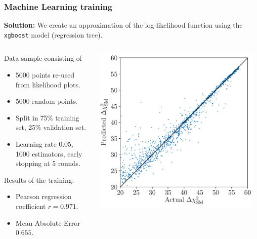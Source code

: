 \documentclass[mathserif, 10pt, dvipsnames]{beamer}
\begin{document}
\begin{frame}\frametitle{Machine Learning training}

    \textbf{Solution:} We create an approximation of the log-likelihood function using the \texttt{xgboost} model (regression tree).

    \begin{columns}
        \begin{column}{0.5\textwidth}
            Data sample consisting of
            \begin{itemize}
                \item 5000 points re-used from likelihood plots.
                \item 5000 random points.
                \item Split in 75\% training set, 25\% validation set.
                \item Learning rate 0.05, 1000 estimators, early stopping at 5 rounds.
            \end{itemize}
            Results of the training:
            \begin{itemize}
                \item Pearson regression coefficient $r=0.971$.
                \item Mean Absolute Error $0.655$.
            \end{itemize}
        \end{column}
        \begin{column}{0.5\textwidth}
            \includegraphics[width=\columnwidth]{figures/regression_xgb.pdf}
        \end{column}
    \end{columns}

\end{frame}
\end{document}
